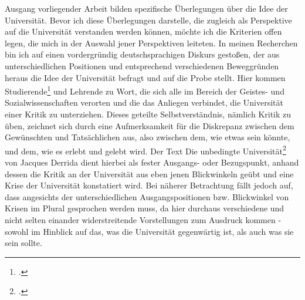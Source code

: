 \documentclass[11pt]{article}
\begin{document}
Ausgang vorliegender Arbeit bilden spezifische Überlegungen über die Idee der
Universität. Bevor ich diese Überlegungen darstelle, die zugleich als
Perspektive auf die Universität verstanden werden können, möchte ich die
Kriterien offen legen, die mich in der Auswahl jener Perspektiven leiteten. In
meinen Recherchen bin ich auf einen vordergründig deutschsprachigen Diskurs
gestoßen, der aus unterschiedlichen Positionen und entsprechend verschiedenen
Beweggründen heraus die Idee der Universität befragt und auf die Probe stellt.
Hier kommen Studierende\footnotemark \footcitetext{lohman} und Lehrende
\footnotemark {} zu Wort, die sich alle im Bereich der Geistes- und
  Sozialwissenschaften verorten und die das Anliegen verbindet, die Universität
  einer Kritik zu unterziehen. Dieses geteilte Selbstverständnis, nämlich
  Kritik zu üben, zeichnet sich durch eine Aufmerksamkeit für die Diskrepanz
  zwischen dem Gewünschten und Tatsächlichen aus, also zwischen dem, wie etwas
  sein könnte, und dem, wie es erlebt und gelebt wird.\footnotemark
   Der Text \glqq Die
  unbedingte Universität\grqq \footnotemark \footcitetext{derrida} von Jacques Derrida dient hierbei als fester
  Ausgangs- oder Bezugspunkt, anhand dessen die Kritik an der Universität aus
  eben jenen Blickwinkeln geübt und eine Krise der Universität konstatiert
  wird.  Bei näherer Betrachtung fällt jedoch auf, dass angesichts der
  unterschiedlichen Ausgangspositionen bzw. Blickwinkel von Krisen im Plural
  gesprochen werden muss, da hier durchaus verschiedene und nicht selten
  einander widerstreitende Vorstellungen zum Ausdruck kommen - sowohl im
  Hinblick auf das, was die Universität gegenwärtig ist, als auch was sie sein
  sollte. 
\end{document}
